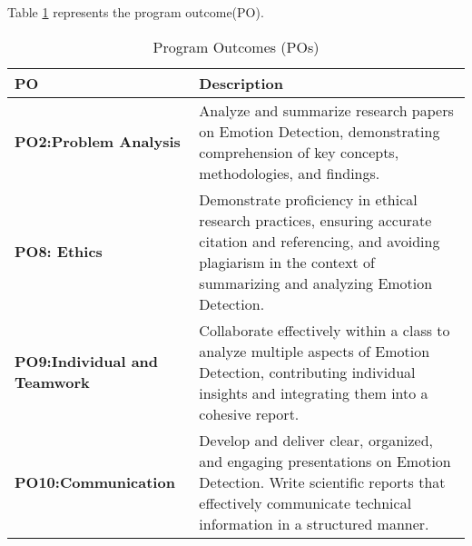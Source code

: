 \documentclass[12pt]{article} %
\begin{document}
Table \ref{tab:po_specific} represents the program outcome(PO).
\begin{table}[htbp]
    \centering
    \caption{Program Outcomes (POs) }
    \label{tab:po_specific}
    \begin{tabular}{|>{\centering\arraybackslash}m{5cm}|>{\raggedright\arraybackslash}m{8cm}|}
        \hline
        \textbf{PO} & \textbf{Description} \\
        \hline
        \textbf{PO2:Problem Analysis}  & Analyze and summarize research papers on Emotion Detection, demonstrating comprehension of key concepts, methodologies, and findings. \\
        \hline
        \textbf{PO8: Ethics} & Demonstrate proficiency in ethical research practices, ensuring accurate citation and referencing, and avoiding plagiarism in the context of summarizing and analyzing Emotion Detection. \\
        \hline
        \textbf{PO9:Individual and Teamwork} & Collaborate effectively within a class to analyze multiple aspects of Emotion Detection, contributing individual insights and integrating them into a cohesive report. \\                    
  
        \hline
        \textbf{PO10:Communication} &  Develop and deliver clear, organized, and engaging presentations on Emotion Detection. Write scientific reports that effectively communicate technical information in a structured manner. \\
        \hline
    \end{tabular}
    
\end{table}
\newpage
\end{document}

